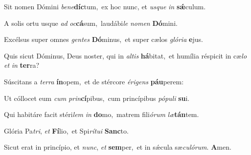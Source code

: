 ﻿\setcounter{versecount}{2}

\vs Sit nomen Dómini \textit{be}\textit{ne}\textbf{díc}tum,~\redgreheightstar ex hoc nunc, et \textit{us}\textit{que} \textit{in} \textbf{sǽ}culum.

\vs A solis ortu usque \textit{ad} \textit{oc}\textbf{cá}sum,~\redgreheightstar laudábi\textit{le} \textit{no}\textit{men} \textbf{Dó}mini.

\vs Excélsus super omnes \textit{gen}\textit{tes} \textbf{Dó}\-mi\-nus,~\redgreheightstar et super cælos \textit{gló}\textit{ri}\textit{a} \textbf{e}jus.

\vs Quis sicut Dóminus, Deus noster, qui in \textit{al}\textit{tis} \textbf{há}bitat,~\redgreheightstar et humília réspicit in cæ\textit{lo} \textit{et} \textit{in} \textbf{ter}ra?

\vs Súscitans a \textit{ter}\textit{ra} \textbf{ín}opem,~\redgreheightstar et de stércore \textit{é}\textit{ri}\textit{gens} \textbf{páu}perem:

\vs Ut cóllocet eum \textit{cum} \textit{prin}\textbf{cí}pibus,~\redgreheightstar cum princípibus \textit{pó}\textit{pu}\textit{li} \textbf{su}i.

\vs Qui habitáre facit stéri\textit{lem} \textit{in} \textbf{do}mo,~\redgreheightstar matrem fili\textit{ó}\textit{rum} \textit{læ}\textbf{tán}tem.

\vs Glória Pa\textit{tri}, \textit{et} \textbf{Fí}lio,~\redgreheightstar et Spi\textit{rí}\textit{tu}\textit{i} \textbf{Sanc}to.

\vs Sicut erat in princípio, et \textit{nunc}, \textit{et} \textbf{sem}per,~\redgreheightstar et in sǽcula sæ\textit{cu}\textit{ló}\textit{rum}. \textbf{A}men.

